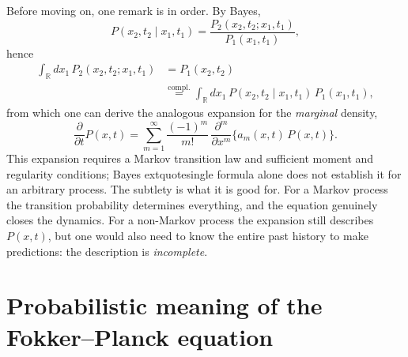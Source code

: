 Before moving on, one remark is in order.
By Bayes,
\begin{equation}
P(x_2,t_2\mid x_1,t_1)=\frac{P_2(x_2,t_2;x_1,t_1)}{P_1(x_1,t_1)},
\end{equation}
hence
\begin{equation}\begin{split}
\int_{\mathbb{R}} dx_1\, P_2(x_2,t_2;x_1,t_1) &= P_1(x_2,t_2)\\
&\overset{\text{compl.}}{=} \int_{\mathbb{R}} dx_1\, P(x_2,t_2\mid x_1,t_1)\,P_1(x_1,t_1),
\end{split}\end{equation}
from which one can derive the analogous expansion for the \emph{marginal} density,
\begin{equation}
\frac{\partial}{\partial t}P(x,t) = \sum_{m=1}^{\infty} \frac{(-1)^m}{m!}\,\frac{\partial^m}{\partial x^m}\big\{a_m(x,t)\,P(x,t)\big\}.
\end{equation}
This expansion requires a Markov transition law and sufficient moment and regularity conditions; Bayes	extquotesingle{} formula alone does not establish it for an arbitrary process.
The subtlety is what it is good for.
For a Markov process the transition probability determines everything, and the equation genuinely closes the dynamics.
For a non-Markov process the expansion still describes $P(x,t)$, but one would also need to know the entire past history to make predictions: the description is \emph{incomplete}.


\section{Probabilistic meaning of the Fokker--Planck equation}

